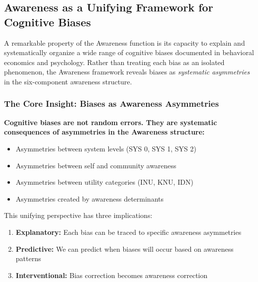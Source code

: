 \subsection{Awareness as a Unifying Framework for Cognitive Biases}
\label{subsec:awareness-biases}

A remarkable property of the Awareness function is its capacity to explain
and systematically organize a wide range of cognitive biases documented in
behavioral economics and psychology. Rather than treating each bias as an
isolated phenomenon, the Awareness framework reveals biases as \emph{systematic
asymmetries} in the six-component awareness structure.

\subsubsection{The Core Insight: Biases as Awareness Asymmetries}

\begin{tcolorbox}[colback=blue!5!white, colframe=blue!75!black, title=Central Thesis]
\textbf{Cognitive biases are not random errors. They are systematic consequences
of asymmetries in the Awareness structure:}
\begin{itemize}
\item Asymmetries between system levels (SYS 0, SYS 1, SYS 2)
\item Asymmetries between self and community awareness
\item Asymmetries between utility categories (INU, KNU, IDN)
\item Asymmetries created by awareness determinants
\end{itemize}
\end{tcolorbox}

This unifying perspective has three implications:
\begin{enumerate}
\item \textbf{Explanatory:} Each bias can be traced to specific awareness asymmetries
\item \textbf{Predictive:} We can predict when biases will occur based on awareness patterns
\item \textbf{Interventional:} Bias correction becomes awareness correction
\end{enumerate}

